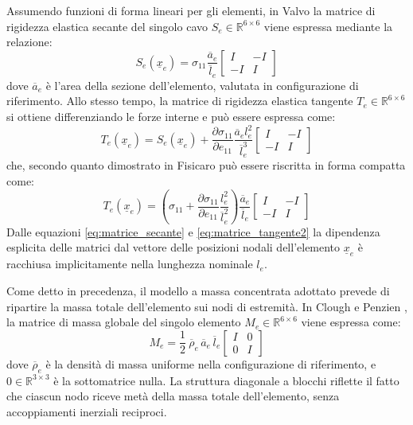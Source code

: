 Assumendo funzioni di forma lineari per gli elementi, in Valvo \cite{Valvo1,Valvo2} la matrice di rigidezza elastica secante del singolo cavo $S_e \in \mathbb{R}^{6\times6}$ viene espressa mediante la relazione:
\begin{equation}
   S_e(\underline{x}_e) = \sigma_{11} \frac{\overline{a}_e}{\overline{l}_e}\begin{bmatrix}
    I & -I \\
    -I &  I 
   \end{bmatrix}
   \label{eq:matrice_secante}
\end{equation}
dove $\overline{a}_e$ è l'area della sezione dell'elemento, valutata in configurazione di riferimento. Allo stesso tempo, la matrice di rigidezza elastica tangente $T_e \in \mathbb{R}^{6\times6}$ si ottiene differenziando le forze interne e può essere espressa come:
\begin{equation}
   T_e\left(\underline{x}_e\right) = S_e\left(\underline{x}_e\right) + \frac{\partial \sigma_{11}}{\partial e_{11}}\frac{\overline{a}_e l_e^2}{\overline{l}_e^3} \left[\begin{matrix}
    I & -I \\
    -I &  I  
   \end{matrix}\right]
\label{eq:matrice_tangente}
\end{equation}  
che, secondo quanto dimostrato in Fisicaro \cite{Fisicaro} può essere riscritta in forma compatta come: 
\begin{equation}
   T_e\left(\underline{x}_e\right) = \left(\sigma_{11} + \frac{\partial \sigma_{11}}{\partial e_{11}}\frac{l_e^2}{\overline{l}_e^2}\right) \frac{\overline{a}_e}{\overline{l}_e} \left[\begin{matrix}
    I & -I \\
    -I &  I  
   \end{matrix}\right]
\label{eq:matrice_tangente2}
\end{equation}  
Dalle equazioni \eqref{eq:matrice_secante} e \eqref{eq:matrice_tangente2} la dipendenza esplicita delle matrici dal vettore delle posizioni nodali dell'elemento $\underline{x}_e$ è racchiusa implicitamente nella lunghezza nominale $l_e$. 

\vspace{1em}
Come detto in precedenza, il modello a massa concentrata adottato prevede di ripartire la massa totale dell'elemento sui nodi di estremità. In Clough e Penzien \cite{Penzien}, la matrice di massa globale del singolo elemento $M_e \in \mathbb{R}^{6\times6}$ viene espressa come:
\begin{equation}
   M_e = 
   \frac{1}{2}\ \overline{\rho}_e\,\overline{a}_e\,\overline{l}_e 
   \begin{bmatrix}
      I & 0 \\
      0 & I
   \end{bmatrix}
\end{equation}
dove $\overline{\rho}_e$ è la densità di massa uniforme nella configurazione di riferimento, e $0 \in \mathbb{R}^{3\times3}$ è la sottomatrice nulla. La struttura diagonale a blocchi riflette il fatto che ciascun nodo riceve metà della massa totale dell'elemento, senza accoppiamenti inerziali reciproci. 

